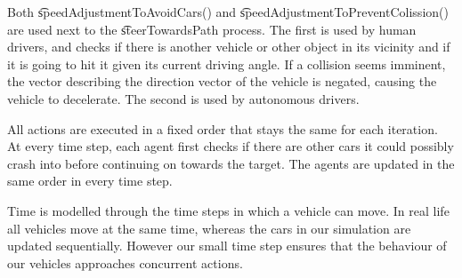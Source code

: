 Both \t{speedAdjustmentToAvoidCars()} and \t{speedAdjustmentToPreventColission()} are used next to the \t{steerTowardsPath} process. The first is used by human drivers, and checks if there is another vehicle or other object in its vicinity and if it is going to hit it given its current driving angle. If a collision seems imminent, the vector describing the direction vector of the vehicle is negated, causing the vehicle to decelerate.
The second is used by autonomous drivers. 


All actions are executed in a fixed order that stays the same for each iteration. At every time step, each agent first checks if there are other cars it could possibly crash into before continuing on towards the target. The agents are updated in the same order in every time step.

Time is modelled through the time steps in which a vehicle can move. In real life all vehicles move at the same time, whereas the cars in our simulation are updated sequentially. However our small time step ensures that the behaviour of our vehicles approaches concurrent actions. 